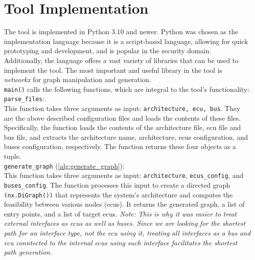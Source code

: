 \section{Tool Implementation}
\label{sec:implementation}

The tool is implemented in Python 3.10 and newer.
Python was chosen as the implementation language because it is a script-based language, allowing for quick prototyping and development,
and is popular in the security domain.
Additionally, the language offers a vast variety of libraries that can be used to implement the tool.
The most important and useful library in the tool is \textit{networkx} for graph manipulation and generation.\\

\texttt{main()} calls the following functions, which are integral to the tool's functionality:\\

\texttt{parse\_files}:\\
This function takes three arguments as input:
\texttt{architecture, ecu, bus}.
They are the above described configuration files and loads the contents of these files. 
Specifically, the function loads the contents of the architecture file, \acrshort{ecu} file and bus file, 
and extracts the architecture name, architecture, \acrshort{ecu}s configuration, and buses configuration, respectively. 
The function returns these four objects as a tuple.\\

\texttt{generate\_graph} (\ref{alg:generate_graph}):\\
This function takes three arguments as input: 
\texttt{architecture}, \texttt{ecus\_config}, and \texttt{buses\_config}. 
The function processes this input to create a directed graph \texttt{(nx.DiGraph())} 
that represents the system's architecture and computes the feasibility between various nodes (\acrshort{ecu}s). 
It returns the generated graph, a list of entry points, and a list of target \acrshort{ecu}s.
\textit{Note: This is why it was easier to treat external interfaces as \acrshort{ecu}s as well as buses.
Since we are looking for the shortest path for an interface type, not the \acrshort{ecu} using it, treating all interfaces
as a bus and \acrshort{ecu} conntected to the internal \acrshort{ecu}s using such interface facilitates the shortest path generation.}\\

\newpage

